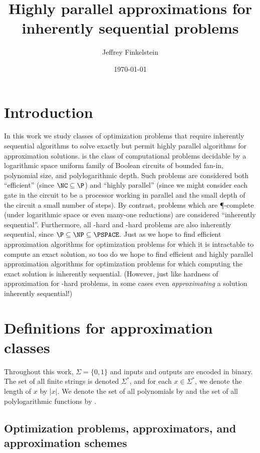 \documentclass[]{article}
\author{Jef{}frey Finkelstein}
\date{\today}
\title{Highly parallel approximations for inherently sequential problems}
\begin{document}
\maketitle

\section{Introduction}

In this work we study classes of optimization problems that require inherently sequential algorithms to solve exactly but permit highly parallel algorithms for approximation solutions.
\NC{} is the class of computational problems decidable by a logarithmic space uniform family of Boolean circuits of bounded fan-in, polynomial size, and polylogarithmic depth.
Such problems are considered both ``efficient'' (since $\NC \subseteq \P$) and ``highly parallel'' (since we might consider each gate in the circuit to be a processor working in parallel and the small depth of the circuit a small number of steps).
By contrast, problems which are \P-complete (under logarithmic space or even \NC{} many-one reductions) are considered ``inherently sequential''.
Furthermore, all \NP-hard and \PSPACE-hard problems are also inherently sequential, since $\P \subseteq \NP \subseteq \PSPACE$.
Just as we hope to find efficient approximation algorithms for optimization problems for which it is intractable to compute an exact solution, so too do we hope to find efficient and highly parallel approximation algorithms for optimization problems for which computing the exact solution is inherently sequential.
(However, just like hardness of approximation for \NP-hard problems, in some cases even \emph{approximating} a solution inherently sequential!)

\section{Definitions for \texorpdfstring{\NC}{NC} approximation classes}

Throughout this work, $\Sigma=\{0, 1\}$ and inputs and outputs are encoded in binary.
The set of all finite strings is denoted $\Sigma^*$, and for each $x\in\Sigma^*$, we denote the length of $x$ by $|x|$.
We denote the set of all polynomials by \poly{} and the set of all polylogarithmic functions by \polylog.

\subsection{Optimization problems, approximators, and approximation schemes}
\end{document}
